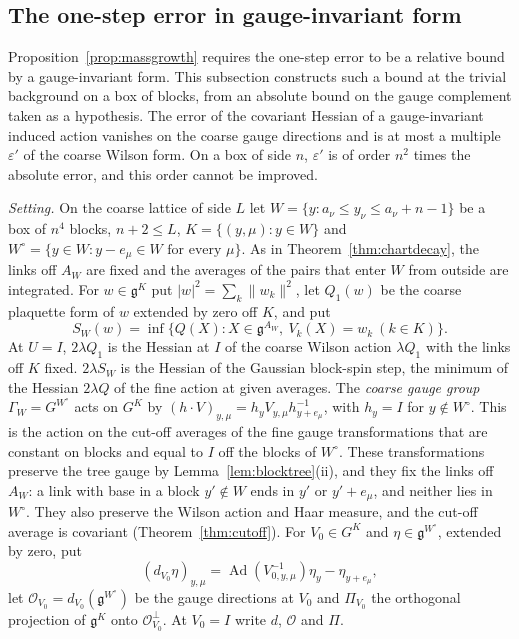 \documentclass[11pt]{amsart}
\theoremstyle{definition}
\theoremstyle{remark}
\numberwithin{equation}{section}
\newcommand{\g}{\mathfrak{g}}
\begin{document}
\subsection{The one-step error in gauge-invariant form}\label{ssec:relstep}

Proposition~\ref{prop:massgrowth} requires the one-step error to be a
relative bound by a gauge-invariant form. This subsection constructs such a
bound at the trivial background on a box of blocks, from an absolute bound
on the gauge complement taken as a hypothesis. The error of the covariant
Hessian of a gauge-invariant induced action vanishes on the coarse gauge
directions and is at most a multiple $\varepsilon'$ of the coarse Wilson
form. On a box of side $n$, $\varepsilon'$ is of order $n^2$ times the
absolute error, and this order cannot be improved.

\emph{Setting.} On the coarse lattice of side $L$ let $W=\{y:a_\nu\le y_\nu
\le a_\nu+n-1\}$ be a box of $n^4$ blocks, $n+2\le L$, $K=\{(y,\mu):y\in
W\}$ and $W^\circ=\{y\in W:y-e_\mu\in W\text{ for every }\mu\}$. As in
Theorem~\ref{thm:chartdecay}, the links off $A_W$ are fixed and the averages
of the pairs that enter $W$ from outside are integrated. For $w\in\g^K$ put
$|w|^2=\sum_k\lVert w_k\rVert^2$, let $Q_1(w)$ be the coarse plaquette form
of $w$ extended by zero off $K$, and put
\[
S_W(w)=\inf\bigl\{Q(X):X\in\g^{A_W},\ V_k(X)=w_k\ (k\in K)\bigr\}.
\]
At $U=I$, $2\lambda Q_1$ is the Hessian at $I$ of the coarse Wilson action
$\lambda Q_1$ with the links off $K$ fixed. $2\lambda S_W$ is the Hessian of
the Gaussian block-spin step, the minimum of the Hessian $2\lambda Q$ of
the fine action at given averages. The \emph{coarse gauge group} $\Gamma_W=
G^{W^\circ}$ acts on $G^K$ by $(h\cdot V)_{y,\mu}=h_yV_{y,\mu}h_{y+e_\mu
}^{-1}$, with $h_y=I$ for $y\notin W^\circ$. This is the action on the
cut-off averages of the fine gauge transformations that are constant on
blocks and equal to $I$ off the blocks of $W^\circ$. These transformations
preserve the tree gauge by Lemma~\ref{lem:blocktree}(ii), and they fix the
links off $A_W$: a link with base in a block $y'\notin W$ ends in $y'$ or
$y'+e_\mu$, and neither lies in $W^\circ$. They also preserve the Wilson
action and Haar measure, and the cut-off average is covariant
(Theorem~\ref{thm:cutoff}). For $V_0\in G^K$ and $\eta\in\g^{W^\circ}$,
extended by zero, put
\[
(d_{V_0}\eta)_{y,\mu}=\operatorname{Ad}(V_{0,y,\mu}^{-1})\eta_y-
\eta_{y+e_\mu},
\]
let $\mathcal O_{V_0}=d_{V_0}(\g^{W^\circ})$ be the gauge directions at
$V_0$ and $\Pi_{V_0}$ the orthogonal projection of $\g^K$ onto $\mathcal
O_{V_0}^\perp$. At $V_0=I$ write $d$, $\mathcal O$ and $\Pi$.
\end{document}
